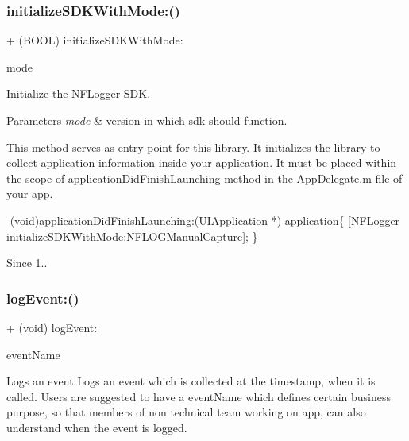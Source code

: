 \subsubsection{\texorpdfstring{initialize\+S\+D\+K\+With\+Mode\+:()}{initializeSDKWithMode:()}}
{\footnotesize\ttfamily + (B\+O\+OL) initialize\+S\+D\+K\+With\+Mode\+: \begin{DoxyParamCaption}\item[{(N\+F\+L\+O\+G\+M\+O\+DE)}]{mode }\end{DoxyParamCaption}}



Initialize the \hyperlink{interface_n_f_logger}{N\+F\+Logger} S\+DK. 


\begin{DoxyParams}{Parameters}
{\em mode} & version in which sdk should function.\\
\hline
\end{DoxyParams}
This method serves as entry point for this library. It initializes the library to collect application information inside your application. It must be placed within the scope of application\+Did\+Finish\+Launching method in the App\+Delegate.\+m file of your app.


\begin{DoxyCode}
-(void)applicationDidFinishLaunching:(UIApplication *) application\{
     [\hyperlink{interface_n_f_logger}{NFLogger} initializeSDKWithMode:NFLOGManualCapture];
\}
\end{DoxyCode}


\begin{DoxySince}{Since}
1.. 
\end{DoxySince}
\mbox{\label{interface_n_f_logger_a932bba0925a8ffefec035de7f3cff73a}} 
\subsubsection{\texorpdfstring{log\+Event\+:()}{logEvent:()}}
{\footnotesize\ttfamily + (void) log\+Event\+: \begin{DoxyParamCaption}\item[{(N\+S\+String $\ast$)}]{event\+Name }\end{DoxyParamCaption}}



Logs an event Logs an event which is collected at the timestamp, when it is called. Users are suggested to have a event\+Name which defines certain business purpose, so that members of non technical team working on app, can also understand when the event is logged. 


